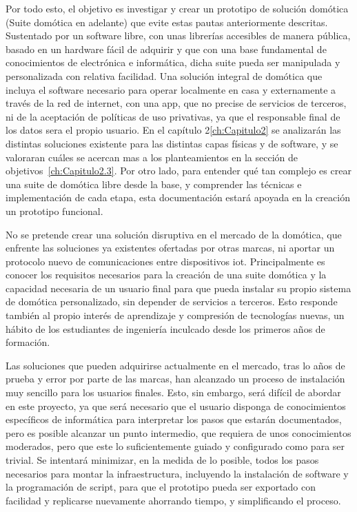 \vspace{1cm}

Por todo esto, el objetivo es investigar y crear un prototipo de solución domótica (Suite domótica en adelante) que evite estas pautas anteriormente descritas. Sustentado por un software libre, con unas librerías accesibles de manera pública, basado en un hardware fácil de adquirir y que con una base fundamental de conocimientos de electrónica e informática, dicha suite pueda ser manipulada y personalizada con relativa facilidad. Una solución integral de domótica que incluya el software necesario para operar localmente en casa y externamente a través de la red de internet, con una \gls{app}, que no precise de servicios de terceros, ni de la aceptación de políticas de uso privativas, ya que el responsable final de los datos sera el propio usuario. En el capítulo 2\ref{ch:Capitulo2} se analizarán las distintas soluciones existente para las distintas capas físicas y de software, y se valoraran cuáles se acercan mas a los planteamientos en la sección de objetivos~\ref{ch:Capitulo2.3}. Por otro lado, para entender qué tan complejo es crear una suite de domótica libre desde la base, y comprender las técnicas e implementación de cada etapa, esta documentación estará apoyada en la creación un prototipo funcional.

\vspace{1cm}

No se pretende crear una solución disruptiva en el mercado de la domótica, que enfrente las soluciones ya existentes ofertadas por otras marcas, ni aportar un protocolo nuevo de comunicaciones entre dispositivos \gls{iot}. Principalmente es conocer los requisitos necesarios para la creación de una suite domótica y la capacidad necesaria de un usuario final para que pueda instalar su propio sistema de domótica personalizado, sin depender de servicios a terceros. Esto responde también al propio interés de aprendizaje y compresión de tecnologías nuevas, un hábito de los estudiantes de ingeniería inculcado desde los primeros años de formación.

\vspace{1cm}

Las soluciones que pueden adquirirse actualmente en el mercado, tras lo años de prueba y error por parte de las marcas, han alcanzado un proceso de instalación muy sencillo para los usuarios finales. Esto, sin embargo, será difícil de abordar en este proyecto, ya que será necesario que el usuario disponga de conocimientos específicos de informática para interpretar los pasos que estarán documentados, pero es posible alcanzar un punto intermedio, que requiera de unos conocimientos moderados, pero que este lo suficientemente guiado y configurado como para ser trivial. Se intentará minimizar, en la medida de lo posible, todos los pasos necesarios para montar la infraestructura, incluyendo la instalación de software y la programación de \gls{script}, para que el prototipo pueda ser exportado con facilidad y replicarse nuevamente ahorrando tiempo, y simplificando el proceso.

